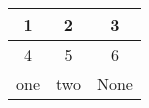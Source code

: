 \documentclass{article}
\begin{document}
\begin{table}
\begin{tabular}{|c|c|c|}
\hline
1 & 2 & 3\\\hline
4 & 5 & 6\\\hline
one & two & None\\
\hline
\end{tabular}
\end{table}
\end{document}
